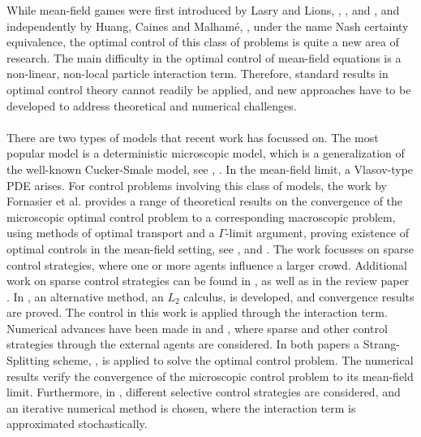 \documentclass[11pt, a4paper]{article}
\theoremstyle{definition}
\begin{document}
While mean-field games were first introduced by Lasry and Lions, \cite{LASRY2006619}, \cite{LASRY2006679},\cite{LASRY4} and \cite{Lasry2007}, and independently by Huang, Caines and Malham\'e,  \cite{Huang1}, under the name Nash certainty equivalence, the optimal control of this class of problems is quite a new area of research. The main difficulty in the optimal control of mean-field equations is a non-linear, non-local particle interaction term. Therefore, standard results in optimal control theory cannot readily be applied, and new approaches have to be developed to address theoretical and numerical challenges.
\\
\\
There are two types of models that recent work has focussed on. The most popular model is a deterministic microscopic model, which is a generalization of the well-known Cucker-Smale model, see \cite{CuckerSmale1}, \cite{CuckerSmale2}. In the mean-field limit, a Vlasov-type PDE arises. For control problems involving this class of models, the work by Fornasier et al. provides a range of theoretical results on the convergence of the microscopic optimal control problem to a corresponding macroscopic problem, using methods of optimal transport and a $\Gamma$-limit argument, proving existence of optimal controls in the mean-field setting, see \cite{Fornasier_2014},
\cite{Fornasier_2014no2}
and \cite{fornasier_lisini_orrieri_savare_2019}. The work focusses on sparse control strategies, where one or more agents influence a larger crowd.
Additional work on sparse control strategies can be found in \cite{piccoli2014no1}, as well as in the review paper \cite{Fornasier_20161no1}.
In \cite{burger2019meanfield}, an alternative method, an $L_2$ calculus, is developed, and convergence results are proved. The control in this work is applied through the interaction term. 
\\
Numerical advances have been made in \cite{burger2019instantaneous} and \cite{burger2016controlling}, where sparse and other control strategies through the external agents are considered. In both papers a Strang-Splitting scheme, \cite{ChengC.Z1976Tiot}, is applied to solve the optimal control problem. The numerical results verify the convergence of the microscopic control problem to its mean-field limit.
Furthermore, in \cite{albi2016selective}, different selective control strategies are considered, and an iterative numerical method is chosen, where the interaction term is approximated stochastically.
\\
\\
\end{document}
